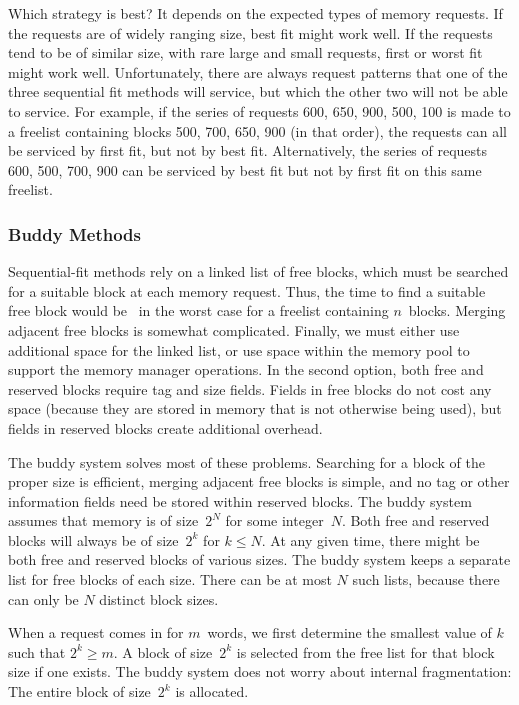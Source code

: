 Which strategy is best?
It depends on the expected types of memory requests.
If the requests are of widely ranging size, best fit might work well.
If the requests tend to be of similar size, with rare large and small
requests, first or worst fit might work well.
Unfortunately, there are always request patterns that one of the
three sequential fit methods will service, but which the other two
will not be able to service.
For example, if the series of requests 600, 650, 900, 500, 100 is
made to a freelist containing blocks 500, 700, 650, 900
(in that order), 
the requests can all be serviced by first fit, but not by best fit.
Alternatively, the series of requests 600, 500, 700, 900 can be
serviced by best fit but not by first fit on this same freelist.

\subsubsection{Buddy Methods}
\label{BuddyMethod}

Sequential-fit methods rely on a linked list of free blocks, which
must be searched for a suitable block at each memory request.
Thus, the time to find a suitable free block would be \Thetan\ in the
worst case for a freelist containing $n$~blocks.
Merging adjacent free blocks is somewhat complicated.
Finally, we must either use additional space for the linked list, or
use space within the memory pool to support the memory manager
operations.
In the second option,
both free and reserved blocks require tag and size fields.
Fields in free blocks do not cost any space (because they are stored
in memory that is not otherwise being used), but fields in reserved
blocks create additional overhead.

The buddy system solves most of these problems.
Searching for a block of the proper size is efficient,
merging adjacent free blocks is simple,
and no tag or other information fields need be stored within reserved
blocks.
The buddy system assumes that memory is of size~$2^N$ for some
integer~$N$.
Both free and reserved blocks will always be of size~$2^k$ for
$k \leq N$.
At any given time, there might be both free and reserved blocks of
various sizes.
The buddy system keeps a separate list for free blocks of each size.
There can be at most $N$ such lists, because there can only be $N$
distinct block sizes.

When a request comes in for $m$~words, we first determine the
smallest value of $k$ such that $2^k \geq m$.
A block of size~$2^k$ is selected from the free list for that block
size if one exists.
The buddy system does not worry about internal fragmentation:
The entire block of size~$2^k$ is allocated.

